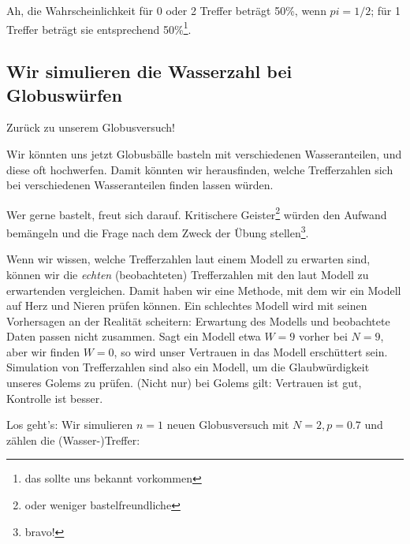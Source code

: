 \documentclass[
  a4paper,
  DIV=11]{scrreprt}
\theoremstyle{definition}
\theoremstyle{remark}
\begin{document}
Ah, die Wahrscheinlichkeit für 0 oder 2 Treffer beträgt 50\%, wenn
\(pi=1/2\); für 1 Treffer beträgt sie entsprechend 50\%\footnote{das
  sollte uns bekannt vorkommen}.

\hypertarget{sec-rbinom}{%
\subsection{Wir simulieren die Wasserzahl bei
Globuswürfen}\label{sec-rbinom}}

Zurück zu unserem Globusversuch!

Wir könnten uns jetzt Globusbälle basteln mit verschiedenen
Wasseranteilen, und diese oft hochwerfen. Damit könnten wir
herausfinden, welche Trefferzahlen sich bei verschiedenen Wasseranteilen
finden lassen würden.

Wer gerne bastelt, freut sich darauf. Kritischere Geister\footnote{oder
  weniger bastelfreundliche} würden den Aufwand bemängeln und die Frage
nach dem Zweck der Übung stellen\footnote{bravo!}.

\begin{tcolorbox}[enhanced jigsaw, title=\textcolor{quarto-callout-important-color}{\faExclamation}\hspace{0.5em}{Wichtig}, bottomtitle=1mm, bottomrule=.15mm, titlerule=0mm, colbacktitle=quarto-callout-important-color!10!white, colframe=quarto-callout-important-color-frame, leftrule=.75mm, left=2mm, toprule=.15mm, colback=white, arc=.35mm, breakable, toptitle=1mm, opacityback=0, rightrule=.15mm, coltitle=black, opacitybacktitle=0.6]

Wenn wir wissen, welche Trefferzahlen laut einem Modell zu erwarten
sind, können wir die \emph{echten} (beobachteten) Trefferzahlen mit den
laut Modell zu erwartenden vergleichen. Damit haben wir eine Methode,
mit dem wir ein Modell auf Herz und Nieren prüfen können. Ein schlechtes
Modell wird mit seinen Vorhersagen an der Realität scheitern: Erwartung
des Modells und beobachtete Daten passen nicht zusammen. Sagt ein Modell
etwa \(W=9\) vorher bei \(N=9\), aber wir finden \(W=0\), so wird unser
Vertrauen in das Modell erschüttert sein. Simulation von Trefferzahlen
sind also ein Modell, um die Glaubwürdigkeit unseres Golems zu prüfen.
(Nicht nur) bei Golems gilt: Vertrauen ist gut, Kontrolle ist besser.

\end{tcolorbox}

Los geht's: Wir simulieren \(n=1\) neuen Globusversuch mit
\(N=2, p=0.7\) und zählen die (Wasser-)Treffer:
\end{document}
